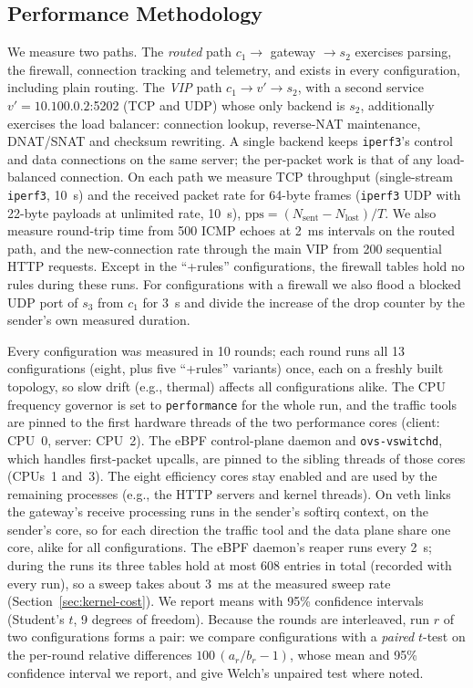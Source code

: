 \documentclass[conference]{IEEEtran}
\begin{document}
\subsection{Performance Methodology}
We measure two paths. The \emph{routed} path $c_1 \to$ gateway $\to s_2$
exercises parsing, the firewall, connection tracking and telemetry, and
exists in every configuration, including plain routing. The \emph{VIP} path
$c_1 \to v' \to s_2$, with a second service $v'=10.100.0.2$:5202 (TCP and UDP)
whose only backend is $s_2$, additionally exercises the load balancer:
connection lookup, reverse-NAT maintenance, DNAT/SNAT and checksum rewriting.
A single backend keeps \texttt{iperf3}'s control and data connections on the
same server; the per-packet work is that of any load-balanced connection. On
each path we measure TCP throughput (single-stream \texttt{iperf3}, 10~s) and
the received packet rate for 64-byte frames (\texttt{iperf3} UDP with 22-byte
payloads at unlimited rate, 10~s), $\mathrm{pps}=(N_{\mathrm{sent}}-
N_{\mathrm{lost}})/T$. We also measure round-trip time from 500 ICMP echoes
at 2~ms intervals on the routed path, and the new-connection rate through the
main VIP from 200 sequential HTTP requests. Except in the ``+rules''
configurations, the firewall tables hold no rules during these runs. For
configurations with a firewall we also flood a
blocked UDP port of $s_3$ from $c_1$ for 3~s and divide the increase of the
drop counter by the sender's own measured duration.

Every configuration was measured in 10 rounds; each round runs all 13
configurations (eight, plus five ``+rules'' variants) once, each on a freshly
built topology, so slow drift (e.g., thermal) affects all configurations
alike. The CPU frequency governor is set
to \texttt{performance} for the whole run, and the traffic tools are pinned to
the first hardware threads of the two performance cores (client: CPU~0,
server: CPU~2). The eBPF control-plane daemon and \texttt{ovs-vswitchd}, which
handles first-packet upcalls, are pinned to the sibling threads of those
cores (CPUs~1 and~3). The eight efficiency cores stay enabled and are used
by the remaining processes (e.g., the HTTP servers and kernel threads). On veth
links the gateway's receive processing runs in the sender's softirq context,
on the sender's core, so for each direction the traffic tool and the data
plane share one core, alike for all configurations. The eBPF daemon's reaper
runs every 2~s; during the runs its three tables hold at most 608
entries in total (recorded with every run), so a sweep takes about 3~ms
at the measured sweep rate (Section~\ref{sec:kernel-cost}). We report means with 95\% confidence intervals (Student's $t$, 9
degrees of freedom). Because the rounds are interleaved, run $r$ of two
configurations forms a pair: we compare configurations with a \emph{paired}
$t$-test on the per-round relative differences $100\,(a_r/b_r-1)$, whose mean
and 95\% confidence interval we report, and give Welch's unpaired test where
noted.
\end{document}
